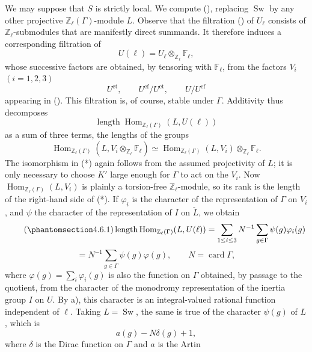 We may suppose that $S$ is strictly local.  We compute (), replacing
$\operatorname{Sw}$ by any other projective
$\mathbb Z_\ell(\Gamma)$-module $L$.  Observe that the filtration
() of $U_\ell$ consists of $\mathbb Z_\ell$-submodules that are
manifestly direct summands.  It therefore induces a corresponding
filtration of
\[
 U(\ell)=U_\ell\otimes_{\mathbb Z_\ell}\mathbb F_\ell,
\]
whose successive factors are obtained, by tensoring with
$\mathbb F_\ell$, from the factors $V_i$ $(i=1,2,3)$
\[
 U^{\mathrm{et}},\qquad
 U^{\mathrm{ef}}/U^{\mathrm{et}},\qquad
 U/U^{\mathrm{ef}}
\]
appearing in ().  This filtration is, of course, stable under
$\Gamma$.  Additivity thus decomposes
\[
 \operatorname{length}
 \operatorname{Hom}_{\mathbb Z_\ell(\Gamma)}(L,U(\ell))
\]
as a sum of three terms, the lengths of the groups
\begin{equation}\tag{*}
 \operatorname{Hom}_{\mathbb Z_\ell(\Gamma)}
   (L,V_i\otimes_{\mathbb Z_\ell}\mathbb F_\ell)
 \simeq
 \operatorname{Hom}_{\mathbb Z_\ell(\Gamma)}(L,V_i)
   \otimes_{\mathbb Z_\ell}\mathbb F_\ell.
\end{equation}
The isomorphism in (*) again follows from the assumed projectivity of
$L$; it is only necessary to choose $K'$ large enough for $\Gamma$ to
act on the $V_i$.  Now
$\operatorname{Hom}_{\mathbb Z_\ell(\Gamma)}(L,V_i)$ is plainly a
torsion-free $\mathbb Z_\ell$-module, so its rank is the length of the
right-hand side of (*).  If $\varphi_i$ is the character of the
representation of $\Gamma$ on $V_i$, and $\psi$ the character of the
representation of $I$ on $\check L$, we obtain
\begin{equation}\tag{\SGARefTarget{sga7.sga7i.eix.n4-6-1}{4.6.1}}
 \operatorname{length}
 \operatorname{Hom}_{\mathbb Z_\ell(\Gamma)}(L,U(\ell))
 =
 \sum_{1\leq i\leq3}N^{-1}
 \sum_{g\in\Gamma}\psi(g)\varphi_i(g)
\end{equation}
\[
 =N^{-1}\sum_{g\in\Gamma}\psi(g)\varphi(g),
 \qquad N=\operatorname{card}\Gamma,
\]
where $\varphi(g)=\sum_i\varphi_i(g)$ is also the function on $\Gamma$
obtained, by passage to the quotient, from the character of the
monodromy representation of the inertia group $I$ on $U$.  By  a),
this character is an integral-valued rational function independent of
$\ell$.  Taking $L=\operatorname{Sw}$, the same is true of the character
$\psi(g)$ of $L$, which is
\[
 a(g)-N\delta(g)+1,
\]
where $\delta$ is the Dirac function on $\Gamma$ and $a$ is the Artin
